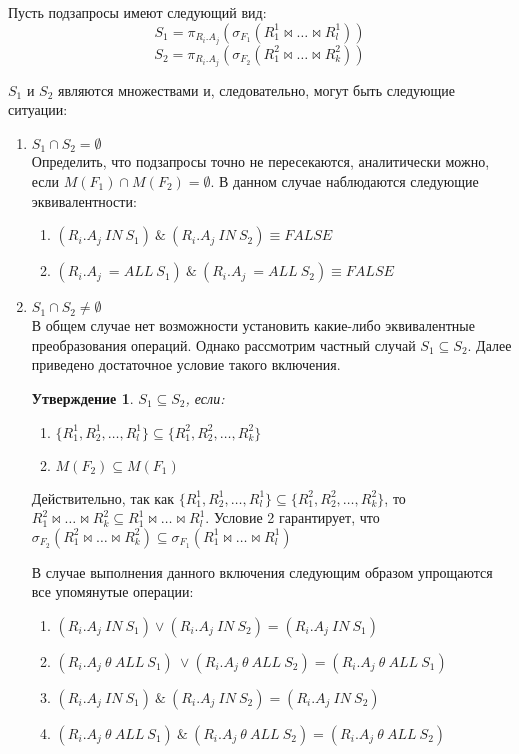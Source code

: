 \documentclass[10pt,a4paper]{article}
\newtheorem{statement}{Утверждение}
\def \n #1{\mathit{#1}}
\begin{document}
Пусть подзапросы имеют следующий вид:
$$S_1 = \pi_{R_i.A_j} (\sigma_{F_1} (R_1^1 \Join \dots \Join R_l^1))$$
$$S_2 = \pi_{R_i.A_j} (\sigma_{F_2} (R_1^2 \Join \dots \Join R_k^2))$$

$S_1$ и $S_2$ являются множествами и, следовательно, могут быть следующие ситуации:
\begin{enumerate}
  \item $S_1 \cap S_2 = \emptyset $\\
  Определить, что подзапросы точно не пересекаются, аналитически можно, если $M(F_1) \cap M(F_2) =
  \emptyset$. В данном случае наблюдаются следующие эквивалентности:
  \begin{enumerate}
    \item $(\n{R_i.A_j}\ \n{IN}\ S_1)\ \&\ (\n{R_i.A_j}\ \n{IN}\ S_2) \equiv \n{FALSE}$
    \item $(\n{R_i.A_j}\ = \n{ALL}\ S_1)\ \&\ (\n{R_i.A_j}\ = \n{ALL}\ S_2) \equiv \n{FALSE}$
  \end{enumerate}
  \item $S_1 \cap S_2 \neq \emptyset $\\
  В общем случае нет возможности установить какие-либо эквивалентные преобразования операций.
  Однако рассмотрим частный случай $S_1 \subseteq S_2$. Далее приведено достаточное условие такого
  включения.
  \begin{statement}
  $S_1 \subseteq S_2$, если:
  \begin{enumerate}[label=\arabic*:]
    \item $\{R_1^1, R_2^1, \dots, R_l^1\} \subseteq \{R_1^2, R_2^2, \dots, R_k^2\}$
    \item $M(F_2) \subseteq M(F_1)$
  \end{enumerate}  
  \label{subquery_subset_condition}
  \end{statement}
  Действительно, так как $\{R_1^1, R_2^1, \dots, R_l^1\} \subseteq \{R_1^2, R_2^2, \dots, R_k^2\}$,
  то $R_1^2 \Join \dots \Join R_k^2 \subseteq R_1^1 \Join \dots \Join R_l^1$. Условие 2 гарантирует,
  что $\sigma_{F_2} (R_1^2 \Join \dots \Join R_k^2) \subseteq \sigma_{F_1} (R_1^1 \Join \dots \Join
  R_l^1)$

  В случае выполнения данного включения следующим образом упрощаются все упомянутые операции:

  \begin{enumerate}
    \item $(\n{R_i.A_j}\ \n{IN}\ S_1) \vee (\n{R_i.A_j}\ \n{IN}\ S_2) = (\n{R_i.A_j}\ \n{IN}\ S_1)$
    \item $(\n{R_i.A_j}\ \theta\ \n{ALL}\ S_1)\ \vee (\n{R_i.A_j}\ \theta\ \n{ALL}\ S_2) =
      (\n{R_i.A_j}\ \theta\ \n{ALL}\ S_1)$
    \item $(\n{R_i.A_j}\ \n{IN}\ S_1)\ \&\ (\n{R_i.A_j}\ \n{IN}\ S_2) = (\n{R_i.A_j}\ \n{IN}\ S_2)$
    \item $(\n{R_i.A_j}\ \theta\ \n{ALL}\ S_1)\ \&\ (\n{R_i.A_j}\ \theta\ \n{ALL}\ S_2) =
      (\n{R_i.A_j}\ \theta\ \n{ALL}\ S_2)$
  \end{enumerate}
\end{enumerate}
\end{document}
